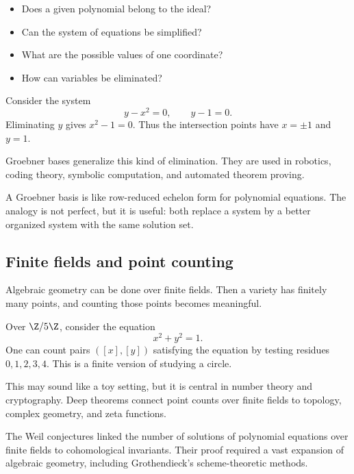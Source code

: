 \begin{itemize}
\item Does a given polynomial belong to the ideal?
\item Can the system of equations be simplified?
\item What are the possible values of one coordinate?
\item How can variables be eliminated?
\end{itemize}

\begin{example}
Consider the system
\[
y-x^2=0,\qquad y-1=0.
\]
Eliminating $y$ gives $x^2-1=0$. Thus the intersection points have
$x=\pm1$ and $y=1$.
\end{example}

Groebner bases generalize this kind of elimination. They are used in robotics,
coding theory, symbolic computation, and automated theorem proving.

\begin{intuitionbox}
A Groebner basis is like row-reduced echelon form for polynomial equations. The
analogy is not perfect, but it is useful: both replace a system by a better
organized system with the same solution set.
\end{intuitionbox}

\subsection{Finite fields and point counting}

Algebraic geometry can be done over finite fields. Then a variety has finitely
many points, and counting those points becomes meaningful.

\begin{example}
Over $\Z/5\Z$, consider the equation
\[
x^2+y^2=1.
\]
One can count pairs $([x],[y])$ satisfying the equation by testing residues
$0,1,2,3,4$. This is a finite version of studying a circle.
\end{example}

This may sound like a toy setting, but it is central in number theory and
cryptography. Deep theorems connect point counts over finite fields to topology,
complex geometry, and zeta functions.

\begin{historybox}
The Weil conjectures linked the number of solutions of polynomial equations over
finite fields to cohomological invariants. Their proof required a vast expansion
of algebraic geometry, including Grothendieck's scheme-theoretic methods.
\end{historybox}


